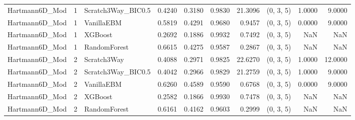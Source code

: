 \begin{tabular}{lrlrrrrlrr}
Hartmann6D_Mod & 1 & Scratch3Way_BIC0.5 & 0.4240 & 0.3180 & 0.9830 & 21.3096 & (0, 3, 5) & 1.0000 & 9.0000 \\
Hartmann6D_Mod & 1 & VanillaEBM & 0.5819 & 0.4291 & 0.9680 & 0.9457 & (0, 3, 5) & 0.0000 & 9.0000 \\
Hartmann6D_Mod & 1 & XGBoost & 0.2692 & 0.1886 & 0.9932 & 0.7492 & (0, 3, 5) & NaN & NaN \\
Hartmann6D_Mod & 1 & RandomForest & 0.6615 & 0.4275 & 0.9587 & 0.2867 & (0, 3, 5) & NaN & NaN \\
Hartmann6D_Mod & 2 & Scratch3Way & 0.4088 & 0.2971 & 0.9825 & 22.6270 & (0, 3, 5) & 1.0000 & 12.0000 \\
Hartmann6D_Mod & 2 & Scratch3Way_BIC0.5 & 0.4042 & 0.2966 & 0.9829 & 21.2759 & (0, 3, 5) & 1.0000 & 9.0000 \\
Hartmann6D_Mod & 2 & VanillaEBM & 0.6260 & 0.4589 & 0.9590 & 0.6768 & (0, 3, 5) & 0.0000 & 9.0000 \\
Hartmann6D_Mod & 2 & XGBoost & 0.2582 & 0.1866 & 0.9930 & 0.7478 & (0, 3, 5) & NaN & NaN \\
Hartmann6D_Mod & 2 & RandomForest & 0.6161 & 0.4162 & 0.9603 & 0.2999 & (0, 3, 5) & NaN & NaN \\
\bottomrule
\end{tabular}
